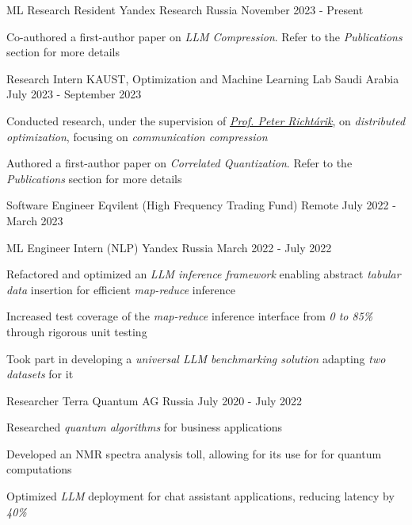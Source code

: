 
\begin{cventries}
  \cventry
    {ML Research Resident}
    {Yandex Research}
    {Russia}
    {November 2023 - Present}
    {
      \begin{cvitems}
        \item {Co-authored a first-author paper on \textit{LLM Compression}. Refer to the \textit{Publications} section for more details}
      \end{cvitems}
    }

  \cventry
    {Research Intern}
    {KAUST, Optimization and Machine Learning Lab}
    {Saudi Arabia}
    {July 2023 - September 2023}
    {
      \begin{cvitems}
        \item {Conducted research, under the supervision of  \href{https://richtarik.org/}{\textit{Prof. Peter Richtárik}}, on \textit{distributed optimization}, focusing on \textit{communication compression}}
        \item {Authored a first-author paper on \textit{Correlated Quantization}. Refer to the \textit{Publications} section for more details}
      \end{cvitems}
    }

  \cventry
    {Software Engineer}
    {Eqvilent (High Frequency Trading Fund)}
    {Remote}
    {July 2022 - March 2023}
    {}

  \cventry
    {ML Engineer Intern (NLP)}
    {Yandex}
    {Russia}
    {March 2022 - July 2022}
    {
      \begin{cvitems} %
        \item {Refactored and optimized an \textit{LLM inference framework} enabling abstract \textit{tabular data} insertion for efficient \textit{map-reduce} inference}
        \item {Increased test coverage of the \textit{map-reduce} inference interface from \textit{0 to 85\%} through rigorous unit testing}
        \item {Took part in developing a \textit{universal LLM benchmarking solution} adapting \textit{two datasets} for it}
      \end{cvitems}
    }
    
  \cventry
    {Researcher} %
    {Terra Quantum AG} %
    {Russia} %
    {July 2020 - July 2022} %
    {
      \begin{cvitems} %
        \item { Researched \textit{quantum algorithms} for business applications }
        \item { Developed an {NMR spectra} analysis toll, allowing for its use for  for quantum computations }
        \item { Optimized \textit{LLM} deployment for chat assistant applications, reducing latency by \textit{40\%} }
      \end{cvitems}
    }
    
\end{cventries}
